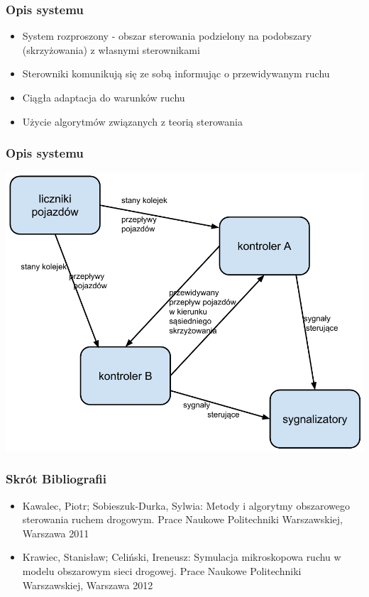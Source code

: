 \documentclass[17pt]{beamer}
\begin{document}
\begin{frame}[shrink=5]
 \frametitle{\vspace{22px}Opis systemu}
 \begin{itemize}
  \item{System rozproszony - obszar sterowania podzielony na podobszary (skrzyżowania) z własnymi sterownikami}
  \item{Sterowniki komunikują się ze sobą informując o przewidywanym ruchu}
  \item{Ciągła adaptacja do warunków ruchu}
  \item{Użycie algorytmów związanych z teorią sterowania}
 \end{itemize}
\end{frame}

\begin{frame}[shrink=5]
 \frametitle{\vspace{22px}Opis systemu}
 \includegraphics[scale=2]{schemat_0.pdf}
\end{frame}

\begin{frame}[shrink=5]
 \frametitle{\vspace{22px}Skrót Bibliografii}
 {\small
 \begin{itemize}
  \item{Kawalec, Piotr; Sobieszuk-Durka, Sylwia: Metody i algorytmy obszarowego sterowania ruchem drogowym. Prace Naukowe Politechniki Warszawskiej, Warszawa 2011}
  \item{Krawiec, Stanisław; Celiński, Ireneusz: Symulacja mikroskopowa ruchu w modelu obszarowym sieci drogowej. Prace Naukowe Politechniki Warszawskiej, Warszawa 2012}
 \end{itemize}
 }
\end{frame}
\end{document}
